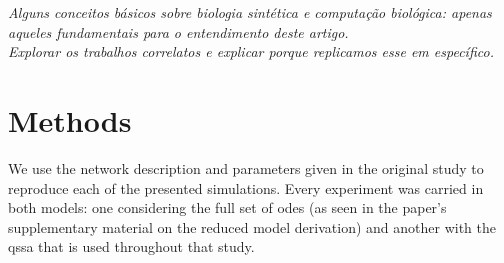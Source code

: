 


  \textit{Alguns conceitos básicos sobre biologia sintética e computação biológica: apenas aqueles fundamentais para o entendimento deste artigo.\\
  Explorar os trabalhos correlatos e explicar porque replicamos esse em específico.\\}


\section{Methods}

  We use the network description and parameters given in the original study to reproduce each of the presented simulations.
  Every experiment was carried in both models: one considering the full set of \ac{odes} (as seen in the paper's supplementary material on the reduced model derivation) and another with the \ac{qssa} that is used throughout that study.

